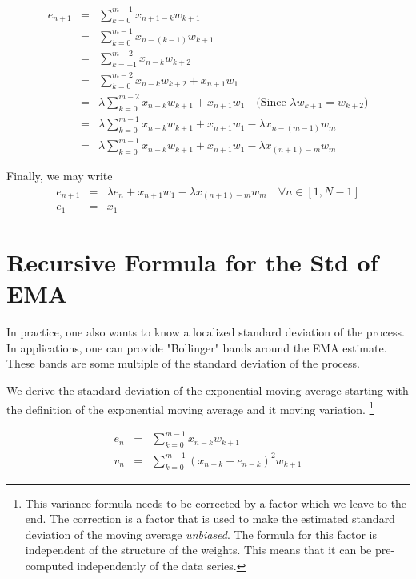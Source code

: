 \documentclass{article}
\begin{document}
\begin{eqnarray*}
e_{n+1} & = & \sum_{k=0}^{m-1} x_{n+1-k} w_{k+1} \\
        & = & \sum_{k=0}^{m-1} x_{n-(k-1)} w_{k+1} \\
        & = & \sum_{k=-1}^{m-2} x_{n-k} w_{k+2}  \\
        & = & \sum_{k=0}^{m-2} x_{n-k} w_{k+2}  + x_{n+1} w_1 \\
        & = & \lambda \sum_{k=0}^{m-2} x_{n-k} w_{k+1}  + x_{n+1} w_1  \quad \text{(Since $\lambda w_{k+1} = w_{k+2}$)} \\
        & = & \lambda \sum_{k=0}^{m-1} x_{n-k} w_{k+1}  + x_{n+1} w_1  
                - \lambda x_{n-(m-1)} w_m  \\
        & = & \lambda \sum_{k=0}^{m-1} x_{n-k} w_{k+1}  + x_{n+1} w_1  
                - \lambda x_{(n+1)-m} w_m 
\end{eqnarray*}

Finally, we may write
\begin{eqnarray}
    e_{n+1} & = & \lambda e_n + x_{n+1} w_1 - \lambda x_{(n+1)-m} w_m \quad \forall n \in [1, N-1] \\
e_1     & = & x_1
\end{eqnarray}

\section{Recursive Formula for the Std of EMA}
In practice, one also wants to know a localized standard deviation of the process.
In applications, one can provide "Bollinger" bands around the EMA estimate.
These bands are some multiple of the standard deviation of the process.

We derive the standard deviation of the exponential moving average starting
with the definition of the exponential moving average and it moving variation.%
\footnote{This variance formula needs to be corrected by a factor which we 
leave to the end. The correction is a factor that is used to make the 
estimated standard deviation of the moving average {\em unbiased\/}.
The formula for this factor is independent of the structure of the weights.
This means that it can be pre-computed independently of the data series.}

\begin{eqnarray}
e_n & = & \sum_{k=0}^{m-1} x_{n-k} w_{k+1} \\
v_n & = & \sum_{k=0}^{m-1} (x_{n-k} - e_{n-k})^2  w_{k+1}
\end{eqnarray}
\end{document}
